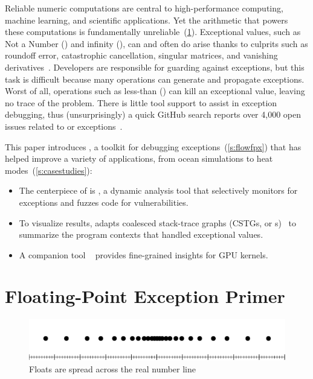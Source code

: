 \documentclass{juliacon}
\begin{document}
Reliable numeric computations are central to high-performance computing,
machine learning, and scientific applications.
Yet the \fp{} arithmetic that powers these computations is fundamentally
unreliable~(\cref{s:background}).
Exceptional values, such as Not a Number (\Nan{}) and infinity (\Inf{}),
can and often do arise thanks to culprits such as roundoff error,
catastrophic cancellation, singular matrices, and vanishing
derivatives~\cite{sdjmrstp-pc-2022,ddghlllprr-correctness-2022,gllprt-correctness-2021,fpchecker-reports,llg-soap-2022,bllmg-xloop-2022}.
Developers are responsible for guarding against exceptions, but this task
is difficult because many operations can generate and propagate exceptions.
Worst of all, operations such as less-than (\code{<}) can kill an exceptional value,
leaving no trace of the problem.
There is little tool support to assist in exception debugging,
thus (unsurprisingly) a quick GitHub search reports over 4,000 open issues
related to \NaN{} or \Inf{} exceptions~\cite{github-issues}.

This paper introduces \FlowFPX{}, a toolkit for debugging
\fp{} exceptions~(\cref{s:flowfpx})
that has helped improve a variety of applications,
from ocean simulations to heat modes~(\cref{s:casestudies}):
\begin{itemize}
  \item
    The centerpiece of \FlowFPX{} is \FT{}, a dynamic analysis tool that
    selectively monitors for exceptions and fuzzes code for vulnerabilities.
  \item
    To visualize results, \FT{} adapts coalesced stack-trace graphs (CSTGs, or
    \CSTG{}s)~\cite{humphreySystematicDebuggingMethods2014}
    to summarize the program contexts that handled exceptional values.
  \item
    A companion tool \GPUFPX{}~\cite{llsflg-hpdc-2023} provides fine-grained insights for GPU kernels.
\end{itemize}


\section{Floating-Point Exception Primer}
\label{s:background}

\begin{figure}[t]\centering
  \includegraphics[trim=10 0 10 0,clip,width=0.95\columnwidth]{fig/real_vs_fp.pdf}
  \caption{Floats are spread across the real number line}
  \label{f:real-vs-fp}
\end{figure}
\end{document}
